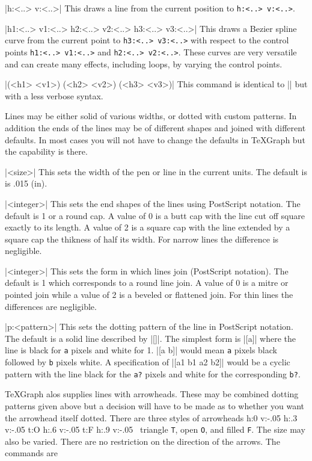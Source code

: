 \mbr\ext\@|\lvec h:<..> v:<..>|
\nbr
This draws a line from the current position to {\tt h:<..> v:<..>}.

\mbr\ext\@|\clvec h1:<..> v1:<..> h2:<..> v2:<..> h3:<..> v3:<..>|
\nbr
This draws a Bezier spline curve from the current point to {\tt h3:<..>
v3:<..>} with respect to the control points {\tt h1:<..> v1:<..>} and 
{\tt h2:<..> v2:<..>}. These curves are very versatile and can create many
effects, including loops,  by varying the control points. 

\mbr\ext\@|\clv  (<h1> <v1>)  (<h2> <v2>)  (<h3> <v3>)|
\nbr
This command is identical to |\clvec| but with a less verbose syntax. 
\endblockmode

Lines may be either solid of various widths, or dotted with custom
patterns. In addition the ends of the lines may be of different shapes and
joined with different defaults. In most cases you will not have to change
the defaults in \TeX Graph but the capability is there. 

\beginblockmode
\ext\@|\penwidth <size>|
\nbr
This sets the width of the pen or line in the current units. The default is
is .015 (in). 

\mbr\ext\@|\linecap <integer>|
\nbr
This sets the end shapes of the lines using PostScript notation. The
default is 1 or a round cap. A value of 0 is a butt cap with the line cut
off square exactly to its length. A value of 2 is a square cap with the
line extended by a square cap the thikness of half its width. For narrow
lines the difference is negligible. 

\mbr\ext\@|\linejoin <integer>|
\nbr
This sets the form in which lines join (PostScript notation). The default
is 1 which corresponds to a round line join. A value of 0 is a mitre or
pointed join while a value of 2 is a beveled or flattened join. For thin
lines the differences are negligible.

\mbr\ext\@|\lpatt p:<pattern>|
\nbr 
This sets the dotting pattern of the line in PostScript notation. The
default is a solid line described by |{[]}|. The simplest form is |{[a]}|
where the line is black for {\tt a} pixels and white for 1. |{[a b]}| would
mean {\tt a} pixels black followed by {\tt b} pixels white. A specification
of |[a1 b1 a2 b2]| would be a cyclic pattern with the line black for the
{\tt a?} pixels and white for the corresponding {\tt b?}.

\endblockmode

\TeX Graph alos supplies lines with arrowheads. These may be combined
dotting patterns given above but a decision will have to be made as to
whether you want the arrowhead itself dotted. 
There are
three styles of arrowheads 
         \btg \move h:0 v:-.05 \avec h:.3 v:-.05
           \arrowheadtype t:O 
           \avec h:.6 v:-.05
           \arrowheadtype t:F
           \avec h:.9 v:-.05
         \etg \hgraphskip\ 
triangle {\tt T}, open {\tt O},
and filled {\tt F}. The size may also be varied. There are no restriction on
the direction  of the arrows. The commands are

